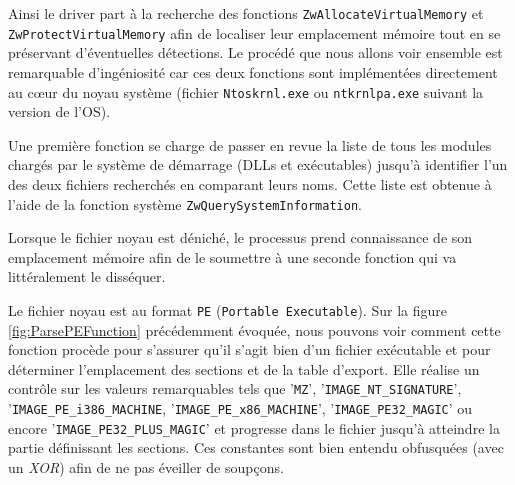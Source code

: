 \documentclass[times,11pt,fullpage]{article}
\begin{document}
Ainsi le driver part à la recherche des fonctions \texttt{ZwAllocateVirtualMemory} et \texttt{ZwProtectVirtualMemory} afin de localiser leur emplacement mémoire tout en se préservant d'éventuelles détections. Le procédé que nous allons voir ensemble est remarquable d'ingéniosité car ces deux fonctions sont implémentées directement au c\oe ur du noyau système (fichier \texttt{Ntoskrnl.exe} ou \texttt{ntkrnlpa.exe} suivant la version de l'OS). 

Une première fonction se charge de passer en revue la liste de tous les modules chargés par le système de démarrage (DLLs et exécutables) jusqu’à identifier l'un des deux fichiers recherchés en comparant leurs noms. Cette liste est obtenue à l'aide de la fonction système \texttt{ZwQuerySystemInformation}. 

Lorsque le fichier noyau est déniché, le processus prend connaissance de son emplacement mémoire afin de le soumettre à une seconde fonction qui va littéralement le disséquer. 

Le fichier noyau est au format \texttt{PE} (\texttt{Portable Executable}). Sur la figure \ref{fig:ParsePEFunction} précédemment évoquée, nous pouvons voir comment cette fonction procède pour s'assurer qu'il s'agit bien d'un fichier exécutable et pour déterminer l'emplacement des sections et de la table d'export. Elle réalise un contrôle sur les valeurs remarquables tels que '\texttt{MZ}', '\texttt{IMAGE\_NT\_SIGNATURE}', '\texttt{IMAGE\_PE\_i386\_MACHINE}, '\texttt{IMAGE\_PE\_x86\_MACHINE}', '\texttt{IMAGE\_PE32\_MAGIC}' ou encore '\texttt{IMAGE\_PE32\_PLUS\_MAGIC}' et progresse dans le fichier jusqu'à atteindre la partie définissant les sections. Ces constantes sont bien entendu obfusquées (avec un {\em XOR}) afin de ne pas éveiller de soupçons.
\end{document}
